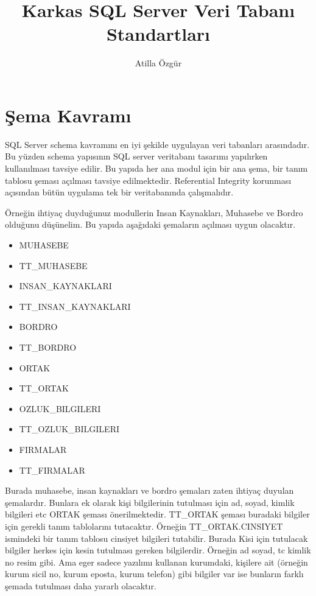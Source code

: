 \documentclass[10pt,a4paper]{article}
\begin{document}
\author{Atilla Özgür}
\title{Karkas SQL Server Veri Tabanı Standartları}

\maketitle

\section{Şema Kavramı}


SQL Server schema kavramını en iyi şekilde uygulayan veri tabanları arasındadır.
Bu yüzden schema yapısının SQL server veritabanı tasarımı yapılırken kullanılması tavsiye edilir.
Bu yapıda her ana modul için bir ana şema, bir tanım tablosu şeması açılması tavsiye edilmektedir.
Referential  Integrity korunması açısından bütün uygulama tek bir veritabanında çalışmalıdır.

Örneğin ihtiyaç duyduğunuz modullerin Insan Kaynakları, Muhasebe ve Bordro olduğunu düşünelim. 
Bu yapıda aşağıdaki şemaların açılması uygun olacaktır.
\begin{itemize}
\item MUHASEBE
\item TT\_MUHASEBE
\item INSAN\_KAYNAKLARI
\item TT\_INSAN\_KAYNAKLARI
\item BORDRO
\item TT\_BORDRO
\item ORTAK
\item TT\_ORTAK
\item OZLUK\_BILGILERI
\item TT\_OZLUK\_BILGILERI
\item FIRMALAR
\item TT\_FIRMALAR

\end{itemize}


Burada muhasebe, insan kaynakları ve bordro şemaları zaten ihtiyaç duyulan şemalardır.
Bunlara ek olarak kişi bilgilerinin tutulması için ad, soyad, kimlik bilgileri etc ORTAK şeması
önerilmektedir. TT\_ORTAK şeması buradaki bilgiler için gerekli tanım tablolarını tutacaktır.
Örneğin TT\_ORTAK.CINSIYET ismindeki bir tanım tablosu cinsiyet bilgileri tutabilir.
Burada Kisi için tutulacak bilgiler herkes için kesin tutulması gereken bilgilerdir. 
Örneğin ad soyad, tc kimlik no resim gibi. Ama eger sadece yazılımı kullanan kurumdaki,
kişilere ait  (örneğin kurum sicil no, kurum eposta, kurum telefon) gibi bilgiler  var ise 
bunların farklı şemada tutulması daha yararlı olacaktır. 
\end{document}
